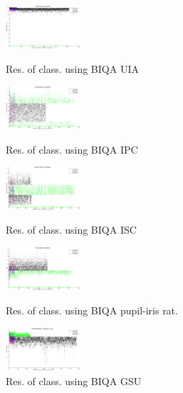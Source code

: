 \begin{figure}
	\begin{minipage}{0.48\linewidth}
		\centering
		\includegraphics[width=0.9\linewidth, height=1.6cm]{pics/iqa_clas_usable_area}
		\caption{Res. of class. using BIQA UIA}
		\label{fig:clas_ua}
	\end{minipage}
	\begin{minipage}{0.48\linewidth}
		\centering
		\includegraphics[width=0.9\linewidth, height=1.6cm]{pics/biqa_clas_ipc}
		\caption{Res. of class. using BIQA IPC}
		\label{fig:clas_ipc}
	\end{minipage}
	\hfill
	\begin{minipage}{0.48\linewidth}
		\centering
		\includegraphics[width=0.9\linewidth, height=1.6cm]{pics/biqa_clas_isc}
		\caption{Res. of class. using BIQA ISC}
		\label{fig:clas_isc}
	\end{minipage}
	\begin{minipage}{0.48\linewidth}
		\centering
		\includegraphics[width=0.9\linewidth, height=1.6cm]{pics/biqa_clas_pir}
		\caption{Res. of class. using BIQA pupil-iris rat.}
		\label{fig:clas_pir}
	\end{minipage}
	\hfill
	\begin{minipage}{0.48\linewidth}
		\centering
		\includegraphics[width=0.9\linewidth, height=1.6cm]{pics/biqa_clas_gsu}
		\caption{Res. of class. using BIQA GSU}
		\label{fig:clas_gsu}
	\end{minipage}
	\begin{minipage}{0.48\linewidth}

\end{minipage}
\end{figure}
